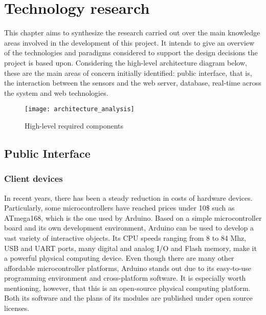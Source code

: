 \chapter{Technology research} \label{technology_research}

This chapter aims to synthesize the research carried out over the main knowledge areas involved in the development of this project. It intends to give an overview of the technologies and paradigms considered to support the design decisions the project is based upon. Considering the high-level architecture diagram below, these are the main areas of concern initially identified: public interface, that is, the interaction between the sensors and the web server, database, real-time across the system and web technologies.

\begin{figure}[ht]
	\centering
	\texttt{[image: architecture\_analysis]}
	\caption{High-level required components}
	\label{fig:arch_analysis}
\end{figure}

\section{Public Interface}

\subsection{Client devices}

In recent years, there has been a steady reduction in costs of hardware devices. Particularly, some microcontrollers have reached prices under 10\$ such as ATmega168, which is the one used by Arduino. Based on a simple microcontroller board and its own development environment, Arduino can be used to develop a vast variety of interactive objects. Its CPU speeds ranging from 8 to 84 Mhz, USB and UART ports, many digital and analog I/O and Flash memory, make it a powerful physical computing device. Even though there are many other affordable microcontroller platforms, Arduino stands out due to its easy-to-use programming environment and cross-platform software. It is especially worth mentioning, however, that this is an open-source physical computing platform. Both its software and the plans of its modules are published under open source licenses.

